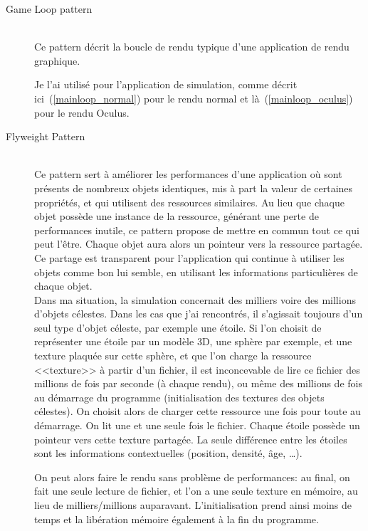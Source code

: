 \documentclass[a4paper,french,12pt]{article}
\begin{document}
\begin{description}
	    \item [Game Loop pattern]~\\
		Ce pattern décrit la boucle de rendu typique d'une application de rendu graphique.

		Je l'ai utilisé pour l'application de simulation, comme décrit ici~(\ref{mainloop_normal}) pour le rendu normal
		et là~(\ref{mainloop_oculus}) pour le rendu Oculus.

	    \item [Flyweight Pattern]~\\
	      Ce pattern sert à améliorer les performances d'une application où sont présents de nombreux objets identiques,
	      mis à part la valeur de certaines propriétés, et qui utilisent des ressources similaires.
	      Au lieu que chaque objet possède une instance de la ressource, générant une perte de performances
	      inutile, ce pattern propose de mettre en commun tout ce qui peut l'être. Chaque objet aura alors un pointeur
	      vers la ressource partagée. Ce partage est transparent pour l'application qui continue à utiliser les objets
	      comme bon lui semble, en utilisant les informations particulières de chaque objet.\\

	      Dans ma situation, la simulation concernait des milliers voire des millions d'objets célestes. Dans les cas que j'ai
	      rencontrés, il s'agissait toujours d'un seul type d'objet céleste, par exemple une étoile.
	      Si l'on choisit de représenter une étoile par un modèle 3D, une sphère par exemple, et une
	      texture plaquée sur cette sphère, et que l'on charge la ressource <<texture>> à partir d'un fichier, il est inconcevable
	      de lire ce fichier des millions de fois par seconde (à chaque rendu), ou même des millions de fois au démarrage du
	      programme (initialisation des textures des objets célestes).
	      On choisit alors de charger cette ressource une fois pour toute au démarrage. On lit une et une seule fois le fichier.
	      Chaque étoile possède un pointeur vers cette texture partagée.
	      La seule différence entre les étoiles sont les informations contextuelles (position, densité, âge, \ldots).

	      On peut alors faire le rendu sans problème de performances: au final, on fait une seule lecture de fichier, et
	      l'on a une seule texture en mémoire, au lieu de milliers/millions auparavant.
	      L'initialisation prend ainsi moins de temps et la libération mémoire également à la fin du programme.


\end{description}
\end{document}
